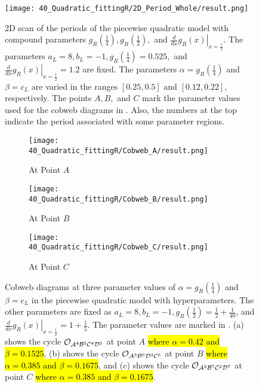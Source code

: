 \begin{figure}
	\centering
	\texttt{[image: 40\_Quadratic\_fittingR/2D\_Period\_Whole/result.png]}
	\caption[2D scan of the periods of the quadratic model with hyperparameters]{
	2D scan of the periods of the piecewise quadratic model with compound parameters $g_R\left(\frac{1}{4}\right), g_R\left(\frac{1}{2}\right),$ and $\left. \frac{d}{dx} g_R\left(x\right) \right|_{x = \frac{1}{2}}$.
	The parameters $a_L = 8, b_L = -1, g_R\left(\frac{1}{4}\right) = 0.525,$ and $\left. \frac{d}{dx} g_R\left(x\right) \right|_{x = \frac{1}{2}} = 1.2$ are fixed.
	The parameters $\alpha = g_R\left(\frac{1}{4}\right)$ and $\beta = c_L$ are varied in the ranges $[0.25, 0.5]$ and $[0.12, 0.22]$, respectively.
	The points $A, B,$ and $C$ mark the parameter values used for the cobweb diagrams in .
	Also, the numbers at the top indicate the period associated with some parameter regions.
	}
	\label{fig:setup.quad.hyper.1.period}
\end{figure}

\begin{figure}
	\centering
	\begin{subfigure}{0.3\textwidth}
		\centering
		\texttt{[image: 40\_Quadratic\_fittingR/Cobweb\_A/result.png]}
		\caption{At Point $A$}
		\label{fig:setup.quad.hyper.1.cobweb.A}
	\end{subfigure}
	\begin{subfigure}{0.3\textwidth}
		\centering
		\texttt{[image: 40\_Quadratic\_fittingR/Cobweb\_B/result.png]}
		\caption{At Point $B$}
		\label{fig:setup.quad.hyper.1.cobweb.B}
	\end{subfigure}
	\begin{subfigure}{0.3\textwidth}
		\centering
		\texttt{[image: 40\_Quadratic\_fittingR/Cobweb\_C/result.png]}
		\caption{At Point $C$}
		\label{fig:setup.quad.hyper.1.cobweb.C}
	\end{subfigure}
	\caption[Cobwebs of the first piecewise quadratic model with hyperparameters]{
	Cobweb diagrams at three parameter values of $\alpha = g_R\left(\frac{1}{4}\right)$ and $\beta = c_L$ in the piecewise quadratic model with hyperparameters.
	The other parameters are fixed as $a_L = 8, b_L = -1, g_R\left(\frac{1}{2}\right) = \frac{1}{2} + \frac{1}{40}$, and $\left. \frac{d}{dx} g_R(x) \right|_{x = \frac{1}{2}} = 1 + \frac{1}{5}$.
	The parameter values are marked in .
	(a) shows the cycle $\mathcal{O}_{\mathcal{A}^4\mathcal{B}^5\mathcal{C}^4\mathcal{D}^5}$ at point $A$ \hl{where $\alpha = 0.42$ and $\beta = 0.1525$},
	(b) shows the cycle $\mathcal{O}_{\mathcal{A}^3\mathcal{B}^6\mathcal{D}^3\mathcal{C}^6}$ at point $B$ \hl{where $\alpha = 0.385$ and $\beta = 0.1675$},
	and (c) shows the cycle $\mathcal{O}_{\mathcal{A}^2\mathcal{B}^7\mathcal{C}^2\mathcal{D}^7}$ at point $C$ \hl{where $\alpha = 0.385$ and $\beta = 0.1675$}.
	}
	\label{fig:setup.quad.hyper.1.cobwebs}
\end{figure}

